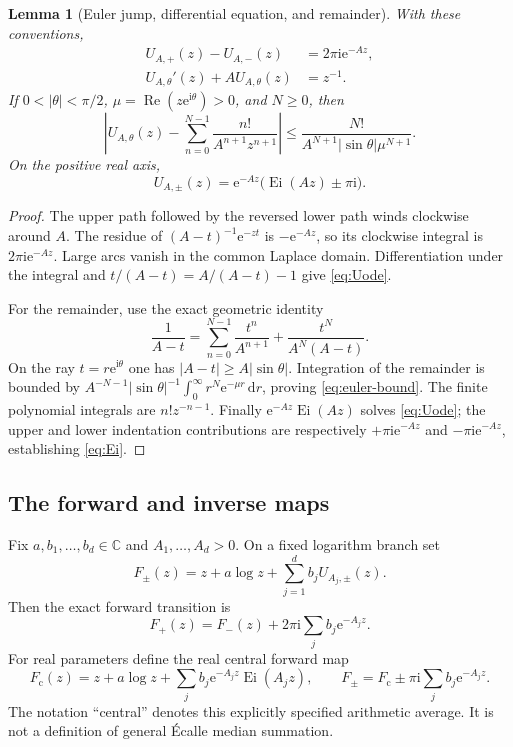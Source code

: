\documentclass[11pt,a4paper]{article}
\numberwithin{equation}{section}
\newtheorem{lemma}[theorem]{Lemma}
\theoremstyle{definition}
\theoremstyle{remark}
\newcommand{\C}{\mathbb C}
\newcommand{\e}{\mathrm e}
\newcommand{\ii}{\mathrm i}
\newcommand{\dd}{\,\mathrm d}
\newcommand{\cF}{F_{\mathrm c}}
\DeclareMathOperator{\Ei}{Ei}
\DeclareMathOperator{\Rea}{Re}
\begin{document}
\begin{lemma}[Euler jump, differential equation, and remainder]
\label{lem:euler}
With these conventions,
\begin{align}
 U_{A,+}(z)-U_{A,-}(z)&=2\pi\ii\e^{-Az},\label{eq:Ujump}\\
 U_{A,\theta}'(z)+A U_{A,\theta}(z)&=z^{-1}.\label{eq:Uode}
\end{align}
If $0<|\theta|<\pi/2$, $\mu=\Rea(z\e^{\ii\theta})>0$, and $N\geq0$, then
\begin{equation}
 \left|U_{A,\theta}(z)-\sum_{n=0}^{N-1}\frac{n!}{A^{n+1}z^{n+1}}\right|
 \leq \frac{N!}{A^{N+1}|\sin\theta|\mu^{N+1}}.
 \label{eq:euler-bound}
\end{equation}
On the positive real axis,
\begin{equation}
 U_{A,\pm}(z)=\e^{-Az}\big(\Ei(Az)\pm\pi\ii\big).
 \label{eq:Ei}
\end{equation}
\end{lemma}
\begin{proof}
The upper path followed by the reversed lower path winds clockwise around $A$. The residue of $(A-t)^{-1}\e^{-zt}$ is $-\e^{-Az}$, so its clockwise integral is $2\pi\ii\e^{-Az}$. Large arcs vanish in the common Laplace domain. Differentiation under the integral and $t/(A-t)=A/(A-t)-1$ give \eqref{eq:Uode}.

For the remainder, use the exact geometric identity
\[
 \frac1{A-t}=\sum_{n=0}^{N-1}\frac{t^n}{A^{n+1}}
 +\frac{t^N}{A^N(A-t)}.
\]
On the ray $t=r\e^{\ii\theta}$ one has $|A-t|\geq A|\sin\theta|$. Integration of the remainder is bounded by
$A^{-N-1}|\sin\theta|^{-1}\int_0^\infty r^N\e^{-\mu r}\dd r$, proving \eqref{eq:euler-bound}. The finite polynomial integrals are $n!z^{-n-1}$.
Finally $\e^{-Az}\Ei(Az)$ solves \eqref{eq:Uode}; the upper and lower indentation contributions are respectively $+\pi\ii\e^{-Az}$ and $-\pi\ii\e^{-Az}$, establishing \eqref{eq:Ei}.
\end{proof}

\subsection{The forward and inverse maps}
Fix $a,b_1,\ldots,b_d\in\C$ and $A_1,\ldots,A_d>0$. On a fixed logarithm branch set
\begin{equation}
 F_\pm(z)=z+a\log z+\sum_{j=1}^d b_jU_{A_j,\pm}(z).
 \label{eq:Fpm}
\end{equation}
Then the exact forward transition is
\begin{equation}
 F_+(z)=F_-(z)+2\pi\ii\sum_jb_j\e^{-A_jz}.
 \label{eq:Fjump}
\end{equation}
For real parameters define the real central forward map
\begin{equation}
 \cF(z)=z+a\log z+\sum_jb_j\e^{-A_jz}\Ei(A_jz),
 \qquad F_\pm=\cF\pm\pi\ii\sum_jb_j\e^{-A_jz}.
 \label{eq:central}
\end{equation}
The notation ``central'' denotes this explicitly specified arithmetic average. It is not a definition of general \'{E}calle median summation.
\end{document}
